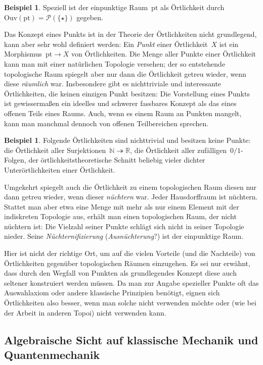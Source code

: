 \documentclass[a4paper,ngerman,12pt]{scrartcl}
\theoremstyle{definition}
\newtheorem{bsp}[defn]{Beispiel}
\theoremstyle{plain}
\theoremstyle{remark}
\newcommand{\RR}{\mathbb{R}}
\newcommand{\NN}{\mathbb{N}}
\renewcommand{\P}{\mathcal{P}}
\newcommand{\Ouv}{\mathrm{Ouv}}
\newcommand{\pt}{\mathrm{pt}}
\renewcommand{\_}{\mathpunct{.}\,}
\newcommand{\?}{\,{:}\,}
\begin{document}
\begin{bsp}Speziell ist der einpunktige Raum~$\pt$ als Örtlichkeit
durch~$\Ouv(\pt) = \P(\{\star\})$ gegeben.\end{bsp}

Das Konzept eines Punkts ist in der Theorie der Örtlichkeiten nicht
grundlegend, kann aber sehr wohl definiert werden: Ein \emph{Punkt} einer
Örtlichkeit~$X$ ist ein Morphismus~$\pt \to X$ von Örtlichkeiten. Die Menge
aller Punkte einer Örtlichkeit kann man mit einer natürlichen Topologie
versehen; der so entstehende topologische Raum spiegelt aber nur dann die
Örtlichkeit getreu wieder, wenn diese \emph{räumlich} war. Insbesondere gibt es
nichttriviale und interessante Örtlichkeiten, die keinen einzigen Punkt
besitzen: Die Vorstellung eines Punkts ist gewissermaßen ein ideelles und
schwerer fassbares Konzept als das eines offenen Teils eines Raums. Auch, wenn
es einem Raum an Punkten mangelt, kann man manchmal dennoch von offenen
Teilbereichen sprechen.

\begin{bsp}Folgende Örtlichkeiten sind nichttrivial und besitzen keine Punkte:
die Örtlichkeit aller Surjektionen~$\NN \twoheadrightarrow \RR$, die
Örtlichkeit aller zufälligen~$0/1$-Folgen, der örtlichkeitstheoretische Schnitt
beliebig vieler dichter Unterörtlichkeiten einer Örtlichkeit.\end{bsp}

Umgekehrt spiegelt auch die Örtlichkeit zu einem topologischen Raum diesen nur
dann getreu wieder, wenn dieser \emph{nüchtern} war. Jeder Hausdorffraum ist
nüchtern.
Stattet man aber etwa eine Menge mit
mehr als nur einem Element mit der indiskreten Topologie aus, erhält man einen
topologischen Raum, der nicht nüchtern ist: Die Vielzahl seiner Punkte schlägt
sich nicht in seiner Topologie nieder. Seine \emph{Nüchternifizierung}
(\emph{Ausnüchterung}?) ist der einpunktige Raum.

Hier ist nicht der richtige Ort, um auf die vielen Vorteile (und die Nachteile) von
Örtlichkeiten gegenüber topologischen Räumen einzugehen. Es sei nur erwähnt,
dass durch den Wegfall von Punkten als grundlegendes Konzept diese auch
seltener konstruiert werden müssen. Da man zur Angabe spezieller Punkte oft das
Auswahlaxiom oder andere klassische Prinzipien benötigt, eignen sich
Örtlichkeiten also besser, wenn man solche nicht verwenden möchte oder (wie bei
der Arbeit in anderen Topoi) nicht verwenden kann.


\subsection{Algebraische Sicht auf klassische Mechanik und Quantenmechanik}
\end{document}
